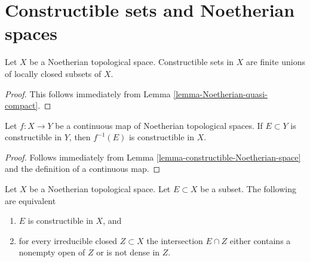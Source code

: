\section{Constructible sets and Noetherian spaces}
\label{section-constructible-Noetherian}

\begin{lemma}
\label{lemma-constructible-Noetherian-space}
Let $X$ be a Noetherian topological space.
Constructible sets in $X$ are finite unions
of locally closed subsets of $X$.
\end{lemma}

\begin{proof}
This follows immediately from
Lemma \ref{lemma-Noetherian-quasi-compact}.
\end{proof}

\begin{lemma}
\label{lemma-constructible-map-Noetherian}
Let $f : X \to Y$ be a continuous map of Noetherian topological spaces.
If $E \subset Y$ is constructible in $Y$, then $f^{-1}(E)$ is constructible
in $X$.
\end{lemma}

\begin{proof}
Follows immediately from
Lemma \ref{lemma-constructible-Noetherian-space}
and the definition of a continuous map.
\end{proof}

\begin{lemma}
\label{lemma-characterize-constructible-Noetherian}
Let $X$ be a Noetherian topological space.
Let $E \subset X$ be a subset.
The following are equivalent
\begin{enumerate}
\item $E$ is constructible in $X$, and
\item for every irreducible closed $Z \subset X$ the intersection
$E \cap Z$ either contains a nonempty open of $Z$ or is not dense in $Z$.
\end{enumerate}
\end{lemma}

